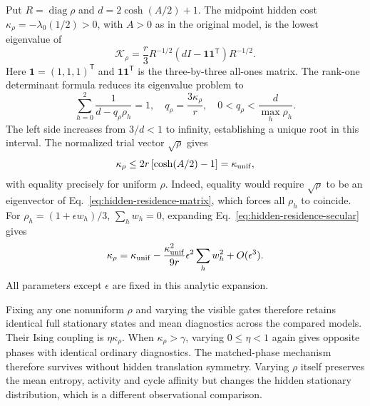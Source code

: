 \documentclass[aps,pre,reprint,amsmath,amssymb,longbibliography,floatfix]{revtex4-2}
\begin{document}
Put $R=\operatorname{diag}\rho$ and $d=2\cosh(A/2)+1$.
The midpoint hidden cost $\kappa_\rho=-\lambda_0(1/2)>0$, with $A>0$ as
in the original model, is the
lowest eigenvalue of 
\begin{equation}
 \mathcal K_\rho=\frac r3 R^{-1/2}
       (dI-\mathbf1\mathbf1^{\mathsf T})R^{-1/2}.
 \label{eq:hidden-residence-matrix}
\end{equation}
Here $\mathbf1=(1,1,1)^{\mathsf T}$ and
$\mathbf1\mathbf1^{\mathsf T}$ is the three-by-three all-ones matrix.
The rank-one determinant formula reduces its eigenvalue problem to
\begin{equation}
 \sum_{h=0}^2\frac1{d-q_\rho\rho_h}=1,\quad
 q_\rho=\frac{3\kappa_\rho}{r},\quad
 0<q_\rho<\frac d{\max_h\rho_h}.
 \label{eq:hidden-residence-secular}
\end{equation}
The left side increases from $3/d<1$ to infinity, establishing
a unique root in this interval. The normalized trial vector
$\sqrt\rho$ gives
\begin{equation}
 \kappa_\rho\le2r\left[\cosh(A/2)-1\right]=\kappa_{\rm unif},
 \label{eq:hidden-residence-bound}
\end{equation}
with equality precisely for uniform $\rho$.
Indeed, equality would require $\sqrt\rho$ to be an eigenvector
of Eq.~\eqref{eq:hidden-residence-matrix}, which forces all $\rho_h$
to coincide.
For $\rho_h=(1+\epsilon w_h)/3$, $\sum_h w_h=0$,
expanding Eq.~\eqref{eq:hidden-residence-secular} gives
\begin{equation}
 \kappa_\rho=\kappa_{\rm unif}
 -\frac{\kappa_{\rm unif}^2}{9r}\epsilon^2\sum_h w_h^2
 +O(\epsilon^3).
 \label{eq:hidden-residence-expansion}
\end{equation}
All parameters except $\epsilon$ are fixed in this analytic expansion.

Fixing any one nonuniform $\rho$ and varying the visible gates therefore
retains identical full stationary states and mean diagnostics across
the compared models. Their Ising coupling is $\eta\kappa_\rho$.
When $\kappa_\rho>\gamma$, varying $0\leq\eta<1$ again gives opposite
phases with identical ordinary diagnostics. The matched-phase mechanism
therefore survives without hidden translation symmetry.
Varying $\rho$ itself preserves the mean entropy, activity and cycle
affinity but changes the hidden stationary distribution, which is a
different observational comparison.
\end{document}
